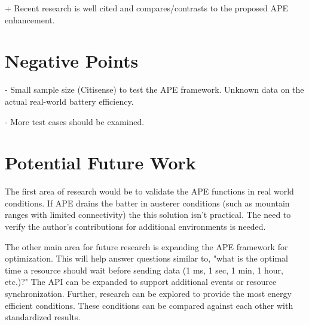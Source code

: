 \documentclass[conference]{IEEEtran}
\begin{document}
+ Recent research is well cited and compares/contrasts to the  proposed APE enhancement. 

\section{Negative Points}
- Small sample size (Citisense) to test the APE framework. Unknown data on the actual real-world battery efficiency. 

- More test cases should be examined.  

\section{Potential Future Work}
The first area of research would be to validate the APE functions in real world conditions. If APE drains the batter in austerer conditions (such as mountain ranges with limited connectivity) the this solution isn't practical. The need to verify the author's contributions for additional environments is needed. 

The other main area for future research is expanding the APE framework for optimization. This will help answer questions similar to, "what is the optimal time a resource should wait before sending data (1 ms, 1 sec, 1 min, 1 hour, etc.)?" The API can be expanded to support additional events or resource synchronization. Further, research can be explored to provide the most energy efficient conditions. These conditions can be compared against each other with standardized results. 

 

%
%


\end{document}
